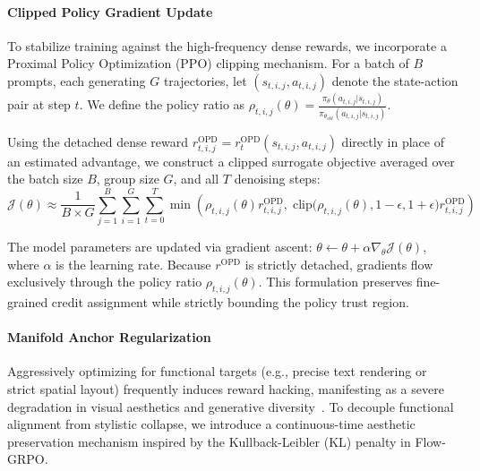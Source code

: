 \paragraph{Clipped Policy Gradient Update}
To stabilize training against the high-frequency dense rewards, we incorporate a Proximal Policy Optimization (PPO) clipping mechanism. For a batch of $B$ prompts, each generating $G$ trajectories, let $(s_{t,i,j}, a_{t,i,j})$ denote the state-action pair at step $t$. We define the policy ratio as $\rho_{t,i,j}(\theta) = \frac{\pi_\theta(a_{t,i,j} | s_{t,i,j})}{\pi_{\theta_{old}}(a_{t,i,j} | s_{t,i,j})}$.

Using the detached dense reward $r_{t,i,j}^{\text{OPD}} = r_t^{\text{OPD}}(s_{t,i,j}, a_{t,i,j})$ directly in place of an estimated advantage, we construct a clipped surrogate objective averaged over the batch size $B$, group size $G$, and all $T$ denoising steps:
\begin{equation}
\mathcal{J}(\theta) \approx \frac{1}{B \times G} \sum_{j=1}^B \sum_{i=1}^G \sum_{t=0}^T \min \left( \rho_{t,i,j}(\theta) r_{t,i,j}^{\text{OPD}}, \; \text{clip}\big(\rho_{t,i,j}(\theta), 1-\epsilon, 1+\epsilon\big) r_{t,i,j}^{\text{OPD}} \right)
\end{equation}

The model parameters are updated via gradient ascent: $\theta \leftarrow \theta + \alpha \nabla_\theta \mathcal{J}(\theta)$, where $\alpha$ is the learning rate. Because $r^{\text{OPD}}$ is strictly detached, gradients flow exclusively through the policy ratio $\rho_{t,i,j}(\theta)$. This formulation preserves fine-grained credit assignment while strictly bounding the policy trust region.
\paragraph{Manifold Anchor Regularization}
Aggressively optimizing for functional targets (e.g., precise text rendering or strict spatial layout) frequently induces reward hacking, manifesting as a severe degradation in visual aesthetics and generative diversity~\cite{liu2025flow}. To decouple functional alignment from stylistic collapse, we introduce a continuous-time aesthetic preservation mechanism inspired by the Kullback-Leibler (KL) penalty in Flow-GRPO. 

